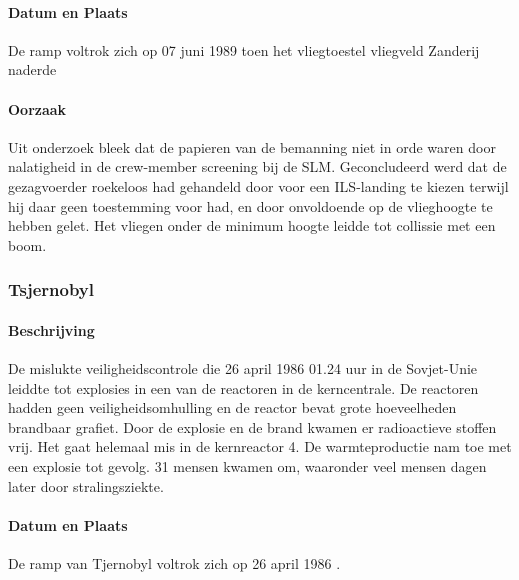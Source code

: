 \documentclass{article}
\begin{document}
	\paragraph{Datum en Plaats}
	De ramp voltrok zich op 07 juni 1989 toen het vliegtoestel vliegveld Zanderij naderde
	\paragraph{Oorzaak}
	\newline \indent
	
	Uit onderzoek bleek dat de papieren van de bemanning niet in orde waren door nalatigheid in de crew-member screening bij de SLM. Geconcludeerd werd dat de gezagvoerder roekeloos had gehandeld door voor een ILS-landing te kiezen terwijl hij daar geen toestemming voor had, en door onvoldoende op de vlieghoogte te hebben gelet. Het vliegen onder de minimum hoogte leidde tot collissie met een boom.
	\subsubsection{Tsjernobyl}
	\paragraph{Beschrijving}
	De mislukte veiligheidscontrole die 26 april 1986 01.24 uur in de Sovjet-Unie leiddte tot explosies in een van de reactoren in de kerncentrale. De reactoren hadden geen veiligheidsomhulling en de reactor bevat grote hoeveelheden brandbaar grafiet. Door de explosie en de brand kwamen er radioactieve stoffen vrij. Het gaat helemaal mis in de kernreactor 4. De warmteproductie nam  toe met een explosie tot gevolg. 31 mensen kwamen om, waaronder veel mensen dagen later door stralingsziekte.
	\paragraph{Datum en Plaats}
	De ramp van Tjernobyl voltrok zich op 26 april 1986 \cite{INSAVienna1992Chernobyl}.
\end{document}
